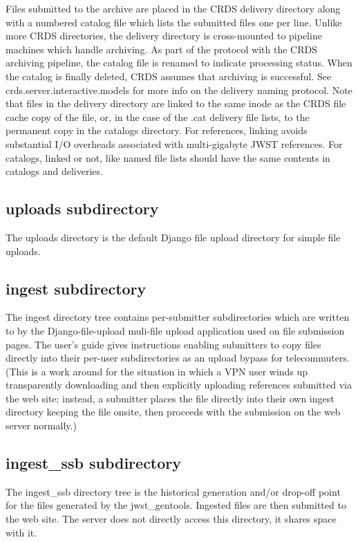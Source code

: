 \documentclass[letterpaper,10pt,english]{sphinxmanual}
\begin{document}
Files submitted to the archive are placed in the CRDS delivery directory along with a numbered catalog file which
lists the submitted files one per line.   Unlike more CRDS directories,  the delivery directory is cross-mounted
to pipeline machines which handle archiving.  As part of the protocol with the CRDS archiving pipeline,  the catalog
file is renamed to indicate processing status.  When the catalog is finally deleted,  CRDS assumes that archiving
is successful.   See crds.server.interactive.models for more info on the delivery naming protocol.  Note that files
in the delivery directory are linked to the same inode as the CRDS file cache copy of the file,  or,  in the case
of the .cat delivery file lists, to the permanent copy in the catalogs directory.  For references,  linking avoids
substantial I/O overheads associated with multi-gigabyte JWST references.  For catalogs,  linked or not,  like named
file lists should have the same contents in catalogs and deliveries.


\subsection{uploads subdirectory}
\label{server_guide:uploads-subdirectory}
The uploads directory is the default Django file upload directory for simple file uploads.


\subsection{ingest subdirectory}
\label{server_guide:ingest-subdirectory}
The ingest directory tree contains per-submitter subdirectories which are written to by the Django-file-upload
muli-file upload application used on file submission pages.  The user's guide gives instructions enabling submitters
to copy files directly into their per-user subdirectories as an upload bypass for telecommuters.  (This is a work
around for the situation in which a VPN user winds up transparently downloading and then explicitly uploading
references submitted via the web site;  instead,  a submitter places the file directly into their own ingest
directory keeping the file onsite,  then proceeds with the submission on the web server normally.)


\subsection{ingest\_ssb subdirectory}
\label{server_guide:ingest-ssb-subdirectory}
The ingest\_ssb directory tree is the historical generation and/or drop-off point for the files generated by the
jwst\_gentools.   Ingested files are then submitted to the web site.   The server does not directly access this
directory,  it shares space with it.
\end{document}
